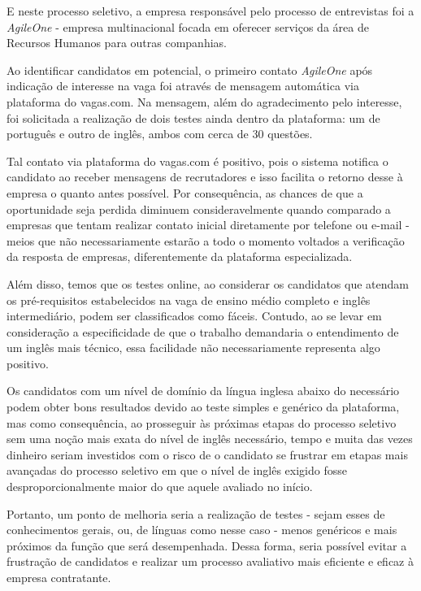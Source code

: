 \documentclass[12pt]{article}
\begin{document}
E neste processo seletivo, a empresa responsável pelo processo de entrevistas foi a \emph {AgileOne} - empresa multinacional focada em oferecer serviços da área de Recursos Humanos para outras companhias.

Ao identificar candidatos em potencial, o primeiro contato  \emph {AgileOne} após indicação de interesse na vaga foi através de mensagem automática  via plataforma do vagas.com. Na mensagem, além do agradecimento pelo interesse, foi solicitada a realização de dois testes ainda dentro da plataforma: um de português e outro de inglês, ambos com cerca de 30 questões.

Tal contato via plataforma do vagas.com é positivo, pois o sistema notifica o candidato ao receber mensagens de recrutadores e isso facilita o retorno desse à empresa o quanto antes possível. Por consequência, as chances de que a oportunidade seja perdida diminuem consideravelmente quando comparado a empresas que tentam realizar contato inicial diretamente por telefone ou e-mail - meios que não necessariamente estarão a todo o momento voltados a verificação da resposta de empresas, diferentemente da plataforma especializada.

Além disso, temos que os testes online, ao considerar os candidatos que atendam os pré-requisitos estabelecidos na vaga de ensino médio completo e inglês intermediário, podem ser classificados como fáceis. Contudo, ao se levar em consideração a especificidade de que o trabalho demandaria o entendimento de um inglês mais técnico, essa facilidade não necessariamente representa algo positivo. 

Os candidatos com um nível de domínio da língua inglesa abaixo do necessário podem obter bons resultados devido ao teste simples e genérico da plataforma, mas como consequência, ao prosseguir às próximas etapas do processo seletivo sem uma noção mais exata do nível de inglês necessário, tempo e muita das vezes dinheiro seriam investidos com o risco de o candidato se frustrar em etapas mais avançadas do processo seletivo em que o nível de inglês exigido fosse desproporcionalmente maior do que aquele avaliado no início. 

Portanto, um ponto de melhoria seria a realização de testes - sejam esses de conhecimentos gerais, ou, de línguas como nesse caso - menos genéricos e mais próximos da função que será desempenhada. Dessa forma, seria possível evitar a frustração de candidatos e realizar um processo avaliativo mais eficiente e eficaz à empresa contratante.
\end{document}
